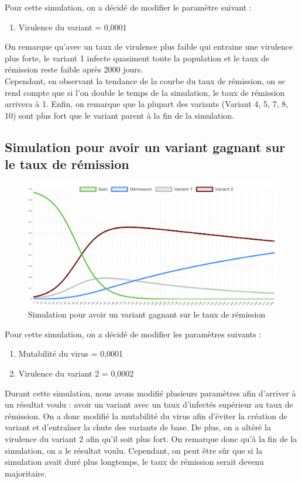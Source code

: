 \documentclass{article}
\begin{document}
Pour cette simulation, on a décidé de modifier le paramètre suivant :
\begin{enumerate}
    \item Virulence du variant = 0,0001 \\
\end{enumerate}
\noindent

On remarque qu'avec un taux de virulence plus faible qui entraine une virulence plus forte, le variant 1 infecte quasiment toute la population et le taux de rémission reste faible après 2000 jours. \\ Cependant, en observant la tendance de la courbe du taux de rémission, on se rend compte que si l'on double le temps de la simulation, le taux de rémission arrivera à 1.
Enfin, on remarque que la plupart des variants (Variant 4, 5, 7, 8, 10) sont plus fort que le variant parent à la fin de la simulation. \\

\subsection{Simulation pour avoir un variant gagnant sur le taux de rémission}

\begin{figure}[h]
    \includegraphics[width=\linewidth]{images/Simulation5.png}
    \caption{Simulation pour avoir un variant gagnant sur le taux de rémission}
    \label{fig:simulation5}
\end{figure}

Pour cette simulation, on a décidé de modifier les paramètres suivants :
\begin{enumerate}
    \item Mutabilité du virus = 0,0001
    \item Virulence du variant 2 = 0,0002
\end{enumerate}
\noindent
Durant cette simulation, nous avons modifié plusieurs paramètres afin d'arriver à un résultat voulu : avoir un variant avec un taux d'infectés supérieur au taux de rémission. On a donc modifié la mutabilité du virus afin d'éviter la création de variant et d'entraîner la chute des variants de base. De plus, on a altéré la virulence du variant 2 afin qu'il soit plus fort. On remarque donc qu'à la fin de la simulation, on a le résultat voulu. Cependant, on peut être sûr que si la simulation avait duré plus longtemps, le taux de rémission serait devenu majoritaire.
\end{document}
